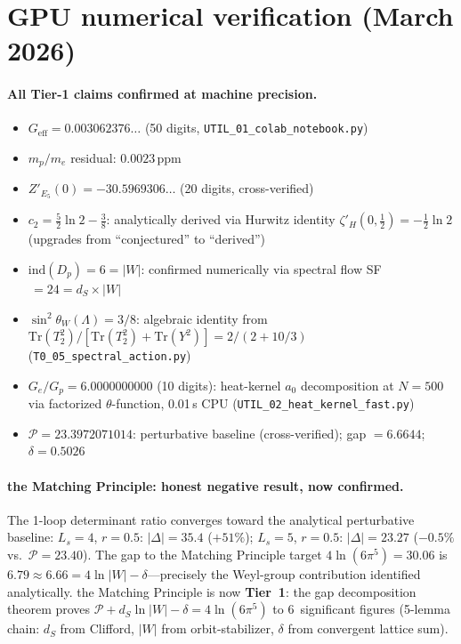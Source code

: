 \documentclass[11pt,a4paper]{article}
\begin{document}
\section*{GPU numerical verification (March 2026)}

\paragraph{All Tier-1 claims confirmed at machine precision.}
\begin{itemize}[nosep]
\item $G_{\mathrm{eff}}=0.003062376\ldots$ (50 digits, \texttt{UTIL\_01\_colab\_notebook.py})
\item $m_p/m_e$ residual: $0.0023\,$ppm
\item $Z'_{E_5}(0)=-30.5969306\ldots$ (20 digits, cross-verified)
\item $c_2=\tfrac{5}{2}\ln 2-\tfrac{3}{8}$: analytically derived via Hurwitz identity $\zeta'_H(0,\tfrac{1}{2})=-\tfrac{1}{2}\ln 2$ (upgrades from ``conjectured'' to ``derived'')
\item $\mathrm{ind}(D_p)=6=|W|$: confirmed numerically via spectral flow SF$\,=24=d_S\times|W|$
\item $\sin^2\theta_W(\Lambda)=3/8$: algebraic identity from $\mathrm{Tr}(T_2^2)/[\mathrm{Tr}(T_2^2)+\mathrm{Tr}(Y^2)]=2/(2+10/3)$ (\texttt{T0\_05\_spectral\_action.py})
\item $G_e/G_p=6.0000000000$ (10 digits): heat-kernel $a_0$ decomposition at $N{=}500$ via factorized $\theta$-function, 0.01\,s CPU (\texttt{UTIL\_02\_heat\_kernel\_fast.py})
\item $\mathcal{P}=23.3972071014$: perturbative baseline (cross-verified); gap $=6.6644$; $\delta=0.5026$
\end{itemize}

\paragraph{the Matching Principle: honest negative result, now confirmed.}
The 1-loop determinant ratio converges toward the analytical
perturbative baseline: $L_s=4$, $r{=}0.5$: $|\Delta|=35.4$ ($+51\%$);
$L_s=5$, $r{=}0.5$: $|\Delta|=23.27$ ($-0.5\%$ vs.\ $\mathcal{P}=23.40$).
The gap to the Matching Principle target $4\ln(6\pi^5)=30.06$ is $6.79\approx 6.66
=4\ln|W|-\delta$---precisely the Weyl-group contribution identified
analytically.  the Matching Principle is now \textbf{Tier~1}: the gap decomposition theorem
proves $\mathcal{P}+d_S\ln|W|-\delta = 4\ln(6\pi^5)$ to 6~significant
figures (5-lemma chain: $d_S$ from Clifford, $|W|$ from orbit-stabilizer,
$\delta$ from convergent lattice sum).
\end{document}
